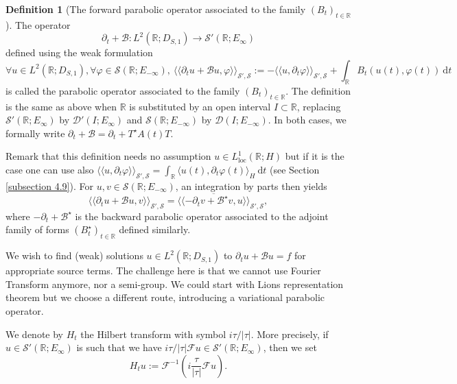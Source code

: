 \documentclass[11pt, letterpaper]{amsart}
\theoremstyle{definition}
\newtheorem{defn}[thm]{Definition}
\theoremstyle{remark}
\newcommand{\llangle}{\langle\!\langle}
\newcommand{\rrangle}{\rangle\!\rangle}
\numberwithin{equation}{section}
\begin{document}
{   
\begin{defn}[The forward parabolic operator associated to the family $(B_t)_{t \in \mathbb{R}}$]\label{Définition opérateur B}
The operator $$\partial_t + \mathcal{B}: L^2(\mathbb{R};D_{S,1}) \rightarrow \mathcal{S}'(\mathbb{R};E_{\infty})$$ defined using the weak formulation 
    \begin{equation*}
    \forall u \in L^2(\mathbb{R};D_{S,1}), \forall \varphi \in \mathcal{S}(\mathbb{R};E_{-\infty}), \  \llangle \partial_t u + \mathcal{B}u , \varphi \rrangle_{\mathcal{S}',\mathcal{S}}:=   -\llangle  u, \partial_t\varphi \rrangle_{\mathcal{S}',\mathcal{S}}+   \int_{\mathbb{R}}   B_t (u(t),\varphi(t)) \ \mathrm{d}t  
    \end{equation*}
     is called the parabolic operator associated to the family $(B_t)_{t \in \mathbb{R}}$. 
     The definition is the same as above when $\mathbb{R}$ is substituted by an open interval $I \subset \mathbb{R}$, replacing $\mathcal{S}'(\mathbb{R};E_{\infty})$ by $\mathcal{D}'(I;E_{\infty})$ and $\mathcal{S}(\mathbb{R};E_{-\infty})$ by $\mathcal{D}(I;E_{-\infty})$. In both cases, we  formally write $\partial_t  + \mathcal{B} = \partial_t  + T^\star A(t) T $.
     \end{defn}
Remark that this definition needs  no assumption $u\in L^1_{\mathrm{loc}}(\mathbb{R}; H)$ but if it is the case one can use also $\llangle  u, \partial_t\varphi \rrangle_{\mathcal{S}',\mathcal{S}}=\int_{\mathbb{R}}  \langle u(t), \partial_t \varphi(t) \rangle_{H} \ \mathrm{d}t$ (see Section \ref{subsection 4.9}). For $u,v \in \mathcal{S}(\mathbb{R};E_{-\infty})$,  an integration by parts then  yields 
$$ \llangle \partial_t u + \mathcal{B}u , v \rrangle_{\mathcal{S}',\mathcal{S}} = \overline{\llangle  -\partial_t v +\mathcal{B}^\star v , u \rrangle}_{\mathcal{S}',\mathcal{S}},  $$
where $-\partial_t + \mathcal{B}^\star$ is the backward parabolic operator associated to the adjoint family of forms $(B_t^\star)_{t \in \mathbb{R}}$ defined similarly.

We wish to find (weak) solutions $u\in L^2(\mathbb{R};D_{S,1})$ to  $\partial_tu+\mathcal{B}u= f $ for appropriate source terms. The challenge here is that we cannot use Fourier Transform anymore, nor a semi-group. We could start with Lions representation theorem but we choose a different route, introducing a variational 
parabolic operator.

We denote by $H_t$ the Hilbert transform with symbol $i \tau/ \left | \tau \right |$. More precisely, if $u \in \mathcal{S'}(\mathbb{R};E_\infty)$ is such that we have $i \tau/ \left | \tau \right | \mathcal{F}u \in \mathcal{S'}(\mathbb{R};E_\infty)$, then we set 
\begin{equation*}
    H_t u := \mathcal{F}^{-1}\left (  i \frac{\tau}{\left | \tau \right |} \mathcal{F}u \right ).
\end{equation*}


}
\end{document}
